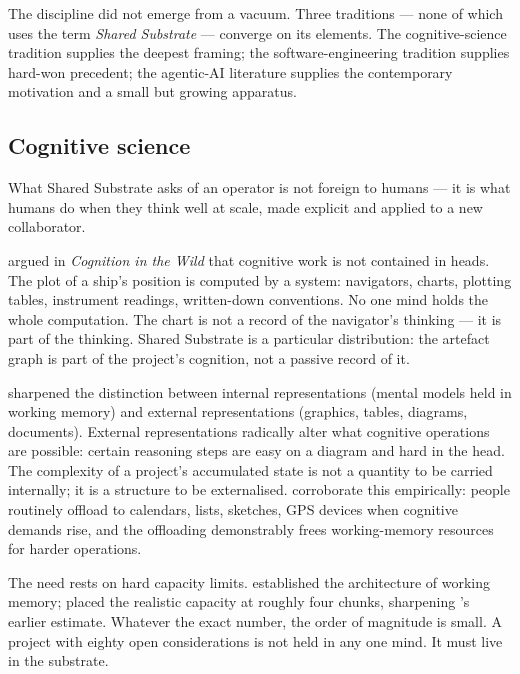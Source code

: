 \documentclass[11pt,a4paper,twocolumn]{article}
\begin{document}
The discipline did not emerge from a vacuum. Three traditions ---
none of which uses the term \emph{Shared Substrate} --- converge
on its elements. The cognitive-science tradition supplies the
deepest framing; the software-engineering tradition supplies hard-won
precedent; the agentic-AI literature supplies the contemporary
motivation and a small but growing apparatus.

\subsection{Cognitive science}

What Shared Substrate asks of an operator is not foreign to
humans --- it is what humans do when they think well at scale, made
explicit and applied to a new collaborator.

\citet{hutchins1995} argued in \emph{Cognition in the Wild} that
cognitive work is not contained in heads. The plot of a ship's
position is computed by a system: navigators, charts, plotting
tables, instrument readings, written-down conventions. No one mind
holds the whole computation. The chart is not a record of the
navigator's thinking --- it is part of the thinking. Shared
Substrate is a particular distribution: the artefact graph is
part of the project's cognition, not a passive record of it.

\citet{scaife1996external} sharpened the distinction between
internal representations (mental models held in working memory) and
external representations (graphics, tables, diagrams, documents).
External representations radically alter what cognitive operations
are possible: certain reasoning steps are easy on a diagram and hard
in the head. The complexity of a project's accumulated state is
not a quantity to be carried internally; it is a structure to be
externalised. \citet{risko2016offloading} corroborate this
empirically: people routinely offload to calendars, lists, sketches,
GPS devices when cognitive demands rise, and the offloading
demonstrably frees working-memory resources for harder operations.

The need rests on hard capacity limits. \citet{baddeley1992wm}
established the architecture of working memory;
\citet{cowan2001magical} placed the realistic capacity at roughly
four chunks, sharpening \citet{miller1956magical}'s earlier
estimate. Whatever the exact number, the order of magnitude is
small. A project with eighty open considerations is not held in any
one mind. It must live in the substrate.
\end{document}
